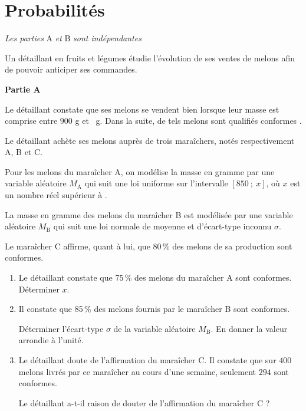 \documentclass{cornouaille}
\begin{document}
\section{Probabilités}
\begin{exercice}


\emph{Les parties} A \emph{et} B \emph{sont indépendantes}

\medskip

Un détaillant en fruits et légumes étudie l'évolution de ses ventes de melons afin de pouvoir
anticiper ses commandes.

\bigskip

\textbf{Partie A}

\medskip

Le détaillant constate que ses melons se vendent bien lorsque leur masse est comprise entre $900$ g et
~g. Dans la suite, de tels melons sont qualifiés \og conformes \fg.

Le détaillant achète ses melons auprès de trois maraîchers, notés respectivement A, B et C.

Pour les melons du maraîcher A, on modélise la masse en gramme par une variable aléatoire $M_{\text{A}}$
qui suit une loi uniforme sur l'intervalle $[850~;~x]$, où $x$ est un nombre réel supérieur à .

La masse en gramme des melons du maraîcher B est modélisée par une variable aléatoire $M_{\text{B}}$ qui
suit une loi normale de moyenne  et d'écart-type inconnu $\sigma$.

Le maraîcher C affirme, quant à lui, que 80\,\% des melons de sa production sont conformes.

\medskip

\begin{enumerate}
\item Le détaillant constate que 75\,\% des melons du maraîcher A sont conformes. Déterminer $x$.
\item Il constate que 85\,\% des melons fournis par le maraîcher B sont conformes.

Déterminer l'écart-type $\sigma$ de la variable aléatoire $M_{\text{B}}$. En donner la valeur arrondie à l'unité.
\item  Le détaillant doute de l'affirmation du maraîcher C. Il constate que sur $400$ melons livrés par ce
maraîcher au cours d'une semaine, seulement $294$ sont conformes.

Le détaillant a-t-il raison de douter de l'affirmation du maraîcher C ?
\end{enumerate}


\end{exercice}
\end{document}
